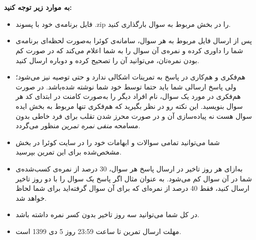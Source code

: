 \documentclass[]{article}
\begin{document}
 \Large \textbf{\\\\
به موارد زیر توجه کنید:}

\begin{itemize}[label=$\ast$]
\item  فایل برنامه‌ی خود با پسوند .zip را در بخش مربوط به سوال بارگذاری کنید.
\item پس از ارسال فایل مربوط به هر سوال، سامانه‌ی کوئرا به‌صورت لحظه‌ای برنامه‌ی شما را داوری کرده و نمره‌ی آن سوال را به شما اعلام می‌کند که در صورت کم بودن نمره‌تان، می‌توانید آن را تصحیح کرده و دوباره ارسال کنید. 
\item هم‌فکری و هم‌کاری در پاسخ به تمرینات اشکالی ندارد و حتی توصیه نیز می‌شود؛ ولی پاسخ ارسالی شما باید حتما توسط خود شما نوشته شده‌باشد. در صورت هم‌فکری در مورد یک سوال، نام افراد دیگر را به‌صورت کامنت در ابتدای کد هر سوال بنویسید.  این نکته رو در نظر بگیرید که هم‌فکری تنها مربوط به بخش ایده سوال هست نه پیاده‌سازی آن و در صورت محرز شدن تقلب برای فرد خاطی بدون مسامحه \emph{ منفی نمره تمرین}
منظور می‌گردد. 
\item شما می‌توانید تمامی سوالات و ابهامات خود را در سایت کوئرا در بخش مشخص‌شده برای این تمرین بپرسید.
\item به‌ازای هر روز تاخیر در ارسال پاسخ هر سوال، 30 درصد از نمره‌ی کسب‌شده‌ی شما در آن سوال کم می‌شود. به عنوان مثال اگر پاسخ یک سوال را با دو روز تاخیر ارسال کنید، فقط 40 درصد از نمره‌ای که برای آن سوال گرفته‌اید برای شما لحاظ خواهد شد.
\item در کل شما می‌توانید سه روز تاخیر بدون کسر نمره داشته باشد.
\item مهلت ارسال تمرین تا ساعت 23:59 روز 5 دی 1399 است.
\end{itemize}



\newpage
\end{document}
